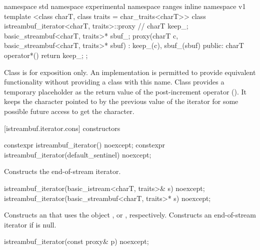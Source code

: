 %
\begin{codeblock}
namespace std { namespace experimental { namespace ranges { inline namespace v1 {
  template <class charT, class traits = char_traits<charT>>
  class istreambuf_iterator<charT, traits>::proxy { // \expos
    charT keep_;
    basic_streambuf<charT, traits>* sbuf_;
    proxy(charT c, basic_streambuf<charT, traits>* sbuf)
      : keep_(c), sbuf_(sbuf) { }
  public:
    charT operator*() { return keep_; }
  };
}}}}
\end{codeblock}

\pnum
Class
is for exposition only.
An implementation is permitted to provide equivalent functionality without
providing a class with this name.
Class
provides a temporary
placeholder as the return value of the post-increment operator
().
It keeps the character pointed to by the previous value
of the iterator for some possible future access to get the character.

[istreambuf.iterator.cons]{ constructors}

%
\begin{itemdecl}
constexpr istreambuf_iterator() noexcept;
constexpr istreambuf_iterator(default_sentinel) noexcept;
\end{itemdecl}

\begin{itemdescr}
\pnum
\effects
Constructs the end-of-stream iterator.
\end{itemdescr}

%
\begin{itemdecl}
istreambuf_iterator(basic_istream<charT, traits>& s) noexcept;
istreambuf_iterator(basic_streambuf<charT, traits>* s) noexcept;
\end{itemdecl}

\begin{itemdescr}
\pnum
\effects
Constructs an
that uses the
object
,
or
,
respectively.
Constructs an end-of-stream iterator if
is null.
\end{itemdescr}


%
\begin{itemdecl}
istreambuf_iterator(const proxy& p) noexcept;
\end{itemdecl}

